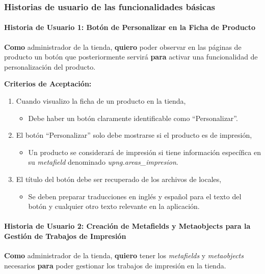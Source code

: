 \documentclass[12pt]{article}
\newcommand{\subsubsubsection}[1]{\paragraph{#1}}
\begin{document}
\subsubsection{Historias de usuario de las funcionalidades básicas}

\subsubsubsection{Historia de Usuario 1: Botón de Personalizar en la Ficha de Producto}\label{sec:historia1}

\textbf{Como} administrador de la tienda, \textbf{quiero} poder observar en las páginas de producto un botón que posteriormente servirá \textbf{para} activar una funcionalidad de personalización del producto.

\vspace{0.5cm}
\textbf{Criterios de Aceptación:}
\begin{enumerate}[label=\arabic*.]
    \item Cuando visualizo la ficha de un producto en la tienda,
          \begin{itemize}[label=--]
              \item Debe haber un botón claramente identificable como ``Personalizar''.    
          \end{itemize}
    \item El botón ``Personalizar'' solo debe mostrarse si el producto es de impresión,
          \begin{itemize}[label=--]
              \item Un producto se considerará de impresión si tiene información específica en su \textit{metafield} denominado \textit{upng.areas\_impresion}.
          \end{itemize}
    \item El título del botón debe ser recuperado de los archivos de locales,
          \begin{itemize}[label=--]
              \item Se deben preparar traducciones en inglés y español para el texto del botón y cualquier otro texto relevante en la aplicación.
          \end{itemize}
\end{enumerate}


\subsubsubsection{Historia de Usuario 2: Creación de Metafields y Metaobjects para la Gestión de Trabajos de Impresión}\label{sec:historia2}

\textbf{Como} administrador de la tienda,
\textbf{quiero} tener los \textit{metafields} y \textit{metaobjects} necesarios \textbf{para} poder gestionar los trabajos de impresión en la tienda.
\end{document}
